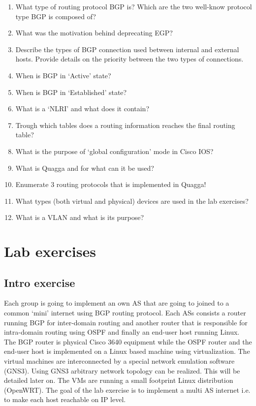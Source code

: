 \documentclass[a4paper]{article}
\begin{document}
\begin{enumerate}
\item What type of routing protocol BGP is? Which are the two well-know protocol type BGP is composed of?
\item What was the motivation behind deprecating EGP?
\item Describe the types of BGP connection used between internal and external hosts. Provide details on the priority between the two types of connections.
\item When is BGP in `Active' state?
\item When is BGP in `Established' state? 
\item What is a `NLRI' and what does it contain?
\item Trough which tables does a routing information reaches the final routing table?
\item What is the purpose of `global configuration' mode in Cisco IOS?
\item What is Quagga and for what can it be used?
\item Enumerate 3 routing protocols that is implemented in Quagga!
\item What types (both virtual and physical) devices are used in the lab exercises?
\item What is a VLAN and what is its purpose?
\end{enumerate}


\section{Lab exercises}

\subsection{Intro exercise}

Each group is going to implement an own AS that are going to joined to a common `mini' internet using BGP routing protocol.
Each ASs consists a router running BGP for inter-domain routing and another router that is responsible for intra-domain routing using OSPF and finally an end-user host running Linux.
The BGP router is physical Cisco 3640 equipment while the OSPF router and the end-user host is implemented on a Linux based machine using virtualization. The virtual machines are interconnected by a special network emulation software (GNS3). Using GNS3 arbitrary network topology can be realized. This will be detailed later on. The VMs are running a small footprint Linux distribution (OpenWRT). The goal of the lab exercise is to implement a multi AS internet i.e. to make each host reachable on IP level.
\end{document}
